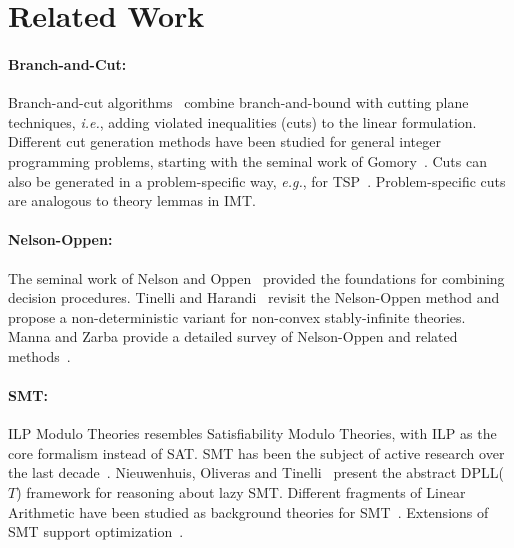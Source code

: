 \documentclass{llncs}
\newcommand{\comment}[1]{}
\newcommand{\ie}[0]{\emph{i.e.}, }
\newcommand{\eg}[0]{\emph{e.g.}, }
\newcommand{\Z}[0]{\ensuremath{\mathcal{Z}}}
\newcommand{\dpllt}[0]{DPLL($T$)}
\begin{document}
\section{Related Work}
\label{sec:related}

\paragraph{Branch-and-Cut:} 
Branch-and-cut algorithms~\cite{branchandcut-handbook} combine
branch-and-bound with cutting plane techniques, \ie adding violated
inequalities (cuts) to the linear formulation. Different cut
generation methods have been studied for general integer programming
problems, starting with the seminal work of
Gomory~\cite{gomory63}. Cuts can also be generated in a
problem-specific way, \eg for TSP~\cite{gh91}. Problem-specific cuts
are analogous to theory lemmas in IMT.

\paragraph{Nelson-Oppen:} 
The seminal work of Nelson and Oppen~\cite{no79} provided the
foundations for combining decision procedures. Tinelli and
Harandi~\cite{noproof} revisit the Nelson-Oppen method and propose a
non-deterministic variant for non-convex stably-infinite
theories. Manna and Zarba provide a detailed survey of Nelson-Oppen
and related methods~\cite{combiningdp}.\comment{On a fundamental
  level, IMT combines $\Z$ and a theory $T$, so this line of results
  directly applies to our framework.}

\paragraph{SMT:}
ILP Modulo Theories resembles Satisfiability Modulo Theories, with ILP
as the core formalism instead of SAT.  SMT has been the subject of
active research over the last
decade~\cite{barrett02,demoura02,dpllt,z3}. Nieuwenhuis, Oliveras and
Tinelli~\cite{dpllt} present the abstract \dpllt{} framework for
reasoning about lazy SMT. Different fragments of Linear Arithmetic
have been studied as background theories for
SMT~\cite{ladpllt,mathsatlia}. Extensions of SMT support
optimization~\cite{smtopt,smtcosts,laqcost}.

\comment{
  \paragraph{Decomposition:} Another family of linear programming
  techniques that bears resemblance to IMT is Benders
  decomposition~\cite{benders62}. The linear programming problem is
  split into a master problem (which has only a subset of the original
  variables) and a subproblem. The master problem is solved first, and
  then the subproblem is solved with the values of the master problem
  fixed (``trial'' values). If the ``trial'' values are unacceptable,
  a cut is derived and added to the master problem. Logic-based
  Benders Decomposition~\cite{logicbenders} generalizes the strategy
  so that the master problem, the subproblem, or both are not
  necessarily linear programs. In IMT, the problem is ``decomposed''
  into a core ILP instance and background theory problems.  }
\end{document}
